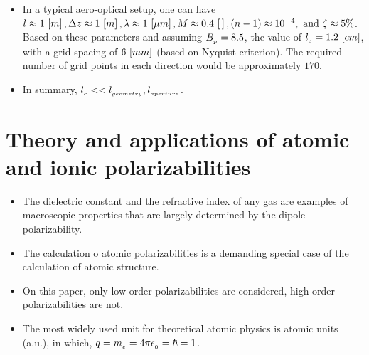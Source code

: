 \begin{itemize}
            \item In a typical aero-optical setup, one can have $l\approx 1\,\left[m\right], \Delta z\approx 1\,\left[m\right], \lambda\approx 1\,\left[\mu m\right], M\approx 0.4\,\left[\,\right], \left(n-1\right) \approx 10^{-4},\text{ and } \zeta\approx 5\%$. Based on these parameters and assuming $B_{_{p}} = 8.5$, the value of $l_{_{c}} = 1.2\,\left[cm\right]$, with a grid spacing of $6\,\left[mm\right]$ (based on Nyquist criterion). The required number of grid points in each direction would be approximately $170$. 
            \item In summary, $l_{_{c}} << l_{_{geometry}}, l_{_{aperture}} $. 
         \end{itemize}
         

\fi 

    \section{Theory and applications of atomic and ionic polarizabilities \cite{mitroy:jop:2010}}
        \begin{itemize}
            \item The dielectric constant and the refractive index of any gas are examples of macroscopic properties that are largely determined by the dipole polarizability.
            \item The calculation o atomic polarizabilities is a demanding special case of the calculation of atomic structure. 
            \item On this paper, only low-order polarizabilities are considered, high-order polarizabilities are not. 
            \item The most widely used unit for theoretical atomic physics is atomic units (a.u.), in which, $q=m_{_{e}}=4\pi\epsilon_{_{0}}=\hbar=1$.  
        \end{itemize} 
\newpage
\printbibliography[title=Bibliography]

